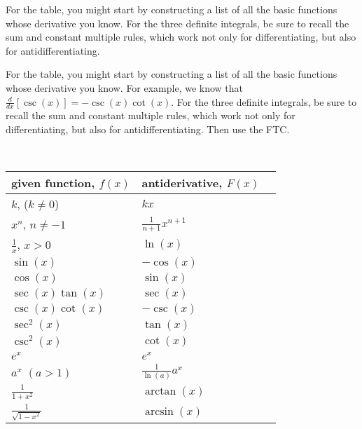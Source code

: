 \begin{smallhint}
For the table, you might start by constructing a list of all the basic functions whose derivative you know.  For the three definite integrals, be sure to recall the sum and constant multiple rules, which work not only for differentiating, but also for antidifferentiating.
\end{smallhint}
\begin{bighint}
For the table, you might start by constructing a list of all the basic functions whose derivative you know.  For example, we know that $\frac{d}{dx} [\csc(x)] = -\csc(x) \cot(x).$  For the three definite integrals, be sure to recall the sum and constant multiple rules, which work not only for differentiating, but also for antidifferentiating.  Then use the FTC.
\end{bighint}
\begin{activitySolution}
\vfill \ 
\pagebreak

\begin{center}
\begin{tabular}{ | l || l | }
   \hline 
\T given function, $f(x)$ \hspace{1.25in} &  antiderivative, $F(x)$  \hspace{1.15in} \ \B \\
\hline \hline
\T $k$, ($k \ne 0$) & $kx$ \B \\
\hline
\T $x^n$, $n \ne -1$ & $\frac{1}{n+1}x^{n+1}$ \B \\
\hline 
\T $\frac{1}{x}$, $x > 0$ & $\ln(x)$ \B \\ 
\hline
\T $\sin(x)$ & $-\cos(x)$ \B \\
\hline
\T $\cos(x)$ & $\sin(x)$ \B \\
\hline
\T $\sec(x) \tan(x)$ & $\sec(x)$ \B \\
\hline
\T $\csc(x) \cot(x)$ & $-\csc(x)$ \B \\
\hline
\T $\sec^2 (x)$ & $\tan(x)$ \B \\
\hline
\T $\csc^2 (x)$ & $\cot(x)$ \B \\
\hline
\T $e^x$  & $e^x$ \B \\
\hline
\T $a^x$ $(a > 1)$  & $\frac{1}{\ln(a)} a^x$ \B \\
\hline
\T $\frac{1}{1+x^2}$ & $\arctan(x)$ \B \\
\hline
\T $\frac{1}{\sqrt{1-x^2}}$ & $\arcsin(x)$ \B \\
\hline
\end{tabular} 
\end{center}


\end{activitySolution}
